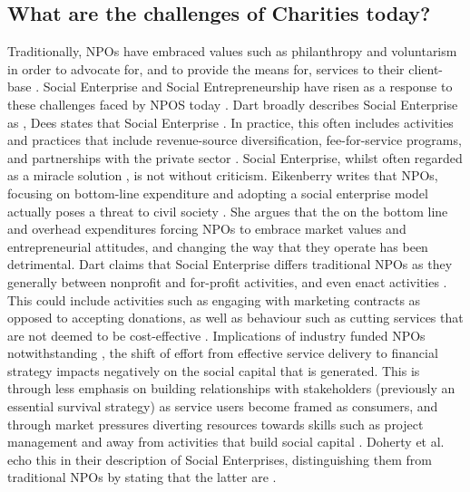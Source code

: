 \subsection{What are the challenges of Charities today?}
Traditionally, NPOs have embraced values such as philanthropy and voluntarism in order to advocate for, and to provide the means for, services to their client-base \cite{alexander_adoption_1998}.  Social Enterprise and Social Entrepreneurship have risen as a response to these challenges faced by NPOS today \cite{dart_legitimacy_2004}. Dart broadly describes Social Enterprise as  \cite{dart_legitimacy_2004}, Dees states that Social Enterprise  \cite{dees_meaning_1998}. In practice, this often includes activities and practices that include revenue-source diversification, fee-for-service programs, and partnerships with the private sector \cite{dart_legitimacy_2004}.
%
Social Enterprise, whilst often regarded as a miracle solution \cite{dart_legitimacy_2004, harding_social_2004, dees_meaning_1998}, is not without criticism. Eikenberry writes that NPOs, focusing on bottom-line expenditure and adopting a social enterprise model actually poses a threat to civil society \cite{eikenberry_marketization_2004}. She argues that the on the bottom line and overhead expenditures forcing NPOs to embrace market values and entrepreneurial attitudes, and changing the way that they operate has been detrimental. Dart claims that Social Enterprise differs traditional NPOs as they generally  between nonprofit and for-profit activities, and even enact  activities \cite{dart_legitimacy_2004}. This could include activities such as engaging with marketing contracts as opposed to accepting donations, as well as behaviour such as cutting services that are not deemed to be cost-effective \cite{eikenberry_marketization_2004}. Implications of industry funded NPOs notwithstanding \cite{jacobson_lifting_2005}, the shift of effort from effective service delivery to financial strategy impacts negatively on the social capital that is generated. This is through less emphasis on building relationships with stakeholders (previously an essential survival strategy) as service users become framed as consumers, and through market pressures diverting resources towards skills such as project management and away from activities that build social capital \cite{eikenberry_marketization_2004}. Doherty et al. echo this in their description of Social Enterprises, distinguishing them from traditional NPOs by stating that the latter are  \cite{doherty_diverse_2006}.


